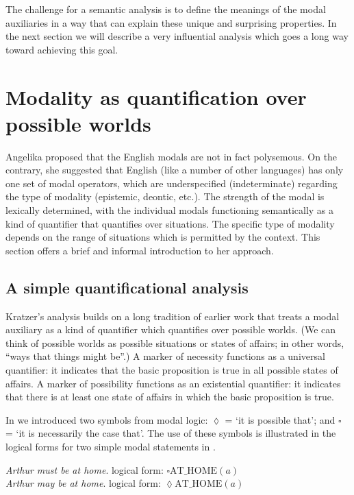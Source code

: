 The challenge for a semantic analysis is to define the meanings of the modal auxiliaries in a way that can explain these unique and surprising properties. In the next section we will describe a very influential analysis which goes a long way toward achieving this goal.


\section{Modality as quantification over possible worlds}\label{sec:16.3}

Angelika \citet{Kratzer1981,Kratzer1991} proposed that the English modals are not in fact polysemous. On the contrary, she suggested that English (like a number of other languages) has only one set of modal operators, which are underspecified (indeterminate) regarding the type of modality (epistemic, deontic, etc.). The strength of the modal is lexically determined, with the individual modals functioning semantically as a kind of quantifier that quantifies over situations. The specific type of modality depends on the range of situations which is permitted by the context. This section offers a brief and informal introduction to her approach.


\subsection{A simple quantificational analysis}\label{sec:16.3.1}

Kratzer’s analysis builds on a long tradition of earlier work that treats a modal auxiliary as a kind of quantifier which quantifies over possible worlds. (We can think of possible worlds as possible situations or states of affairs; in other words, “ways that things might be”.) A marker of necessity functions as a universal quantifier: it indicates that the basic proposition is true in all possible states of affairs. A marker of possibility functions as an existential quantifier: it indicates that there is at least one state of affairs in which the basic proposition is true.



In  we introduced two symbols from modal logic: ${\lozenge}$ = ‘it is possible that’; and ${\square}$ = ‘it is necessarily the case that’. The use of these symbols is illustrated in the logical forms for two simple modal statements in .


\ea \label{ex:16.11}
\ea  \textit{Arthur must be at home}. \hfill logical form: $\square \text{AT\_HOME}(a)$\\
\ex \textit{Arthur may be at home}.    \hfill logical form: $\lozenge \text{AT\_HOME}(a)$
                       \z
\z


